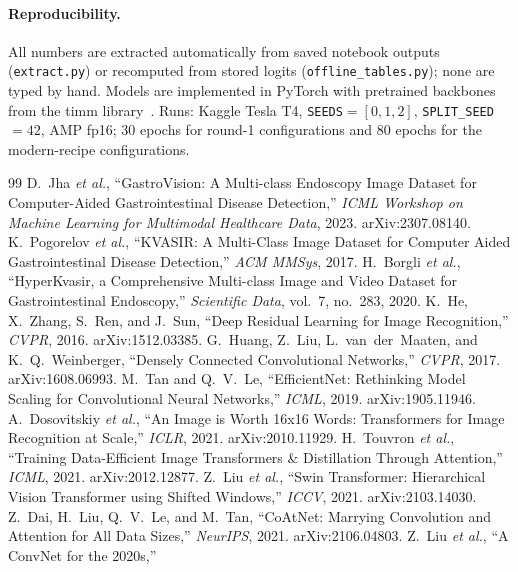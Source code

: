 \documentclass[11pt,a4paper]{article}
\begin{document}
\paragraph{Reproducibility.} All numbers are extracted automatically from saved
notebook outputs (\texttt{extract.py}) or recomputed from stored logits
(\texttt{offline\_tables.py}); none are typed by hand. Models are implemented in
PyTorch with pretrained backbones from the timm library~\cite{timm}. Runs: Kaggle
Tesla T4, \texttt{SEEDS}$=[0,1,2]$, \texttt{SPLIT\_SEED}$=42$, AMP fp16; 30 epochs
for round-1 configurations and 80 epochs for the modern-recipe configurations.

\begin{thebibliography}{99}
\small
{} D.~Jha \emph{et al.}, ``GastroVision: A Multi-class
Endoscopy Image Dataset for Computer-Aided Gastrointestinal Disease Detection,''
\emph{ICML Workshop on Machine Learning for Multimodal Healthcare Data}, 2023.
arXiv:2307.08140.
 K.~Pogorelov \emph{et al.}, ``KVASIR: A Multi-Class Image
Dataset for Computer Aided Gastrointestinal Disease Detection,'' \emph{ACM
MMSys}, 2017.
 H.~Borgli \emph{et al.}, ``HyperKvasir, a Comprehensive
Multi-class Image and Video Dataset for Gastrointestinal Endoscopy,''
\emph{Scientific Data}, vol.~7, no.~283, 2020.
 K.~He, X.~Zhang, S.~Ren, and J.~Sun, ``Deep Residual Learning
for Image Recognition,'' \emph{CVPR}, 2016. arXiv:1512.03385.
 G.~Huang, Z.~Liu, L.~van~der~Maaten, and K.~Q.~Weinberger,
``Densely Connected Convolutional Networks,'' \emph{CVPR}, 2017.
arXiv:1608.06993.
 M.~Tan and Q.~V.~Le, ``EfficientNet: Rethinking Model
Scaling for Convolutional Neural Networks,'' \emph{ICML}, 2019. arXiv:1905.11946.
 A.~Dosovitskiy \emph{et al.}, ``An Image is Worth 16x16 Words:
Transformers for Image Recognition at Scale,'' \emph{ICLR}, 2021.
arXiv:2010.11929.
 H.~Touvron \emph{et al.}, ``Training Data-Efficient Image
Transformers \& Distillation Through Attention,'' \emph{ICML}, 2021.
arXiv:2012.12877.
 Z.~Liu \emph{et al.}, ``Swin Transformer: Hierarchical Vision
Transformer using Shifted Windows,'' \emph{ICCV}, 2021. arXiv:2103.14030.
 Z.~Dai, H.~Liu, Q.~V.~Le, and M.~Tan, ``CoAtNet: Marrying
Convolution and Attention for All Data Sizes,'' \emph{NeurIPS}, 2021.
arXiv:2106.04803.
 Z.~Liu \emph{et al.}, ``A ConvNet for the 2020s,''

\end{thebibliography}
\end{document}
